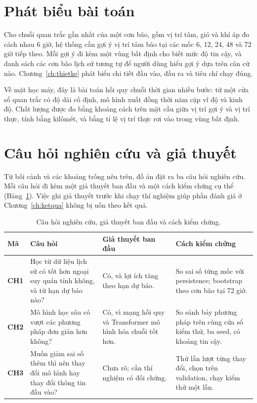 \section{Phát biểu bài toán}

Cho chuỗi quan trắc gần nhất của một cơn bão, gồm vị trí tâm, gió và khí áp
đo cách nhau 6 giờ, hệ thống cần gợi ý vị trí tâm bão tại các mốc 6, 12, 24,
48 và 72 giờ tiếp theo. Mỗi gợi ý đi kèm một vùng bất định cho biết mức độ
tin cậy, và danh sách các cơn bão lịch sử tương tự để người dùng hiểu gợi ý
dựa trên căn cứ nào. Chương~\ref{ch:thietke} phát biểu chi tiết đầu vào, đầu
ra và tiêu chí chạy đúng.

Về mặt học máy, đây là bài toán hồi quy chuỗi thời gian nhiều bước: từ một cửa
sổ quan trắc có độ dài cố định, mô hình xuất đồng thời năm cặp vĩ độ và kinh
độ. Chất lượng được đo bằng khoảng cách trên mặt cầu giữa vị trí gợi ý và vị
trí thực, tính bằng kilômét, và bằng tỉ lệ vị trí thực rơi vào trong vùng bất
định.

\section{Câu hỏi nghiên cứu và giả thuyết}

Từ bối cảnh và các khoảng trống nêu trên, đồ án đặt ra ba câu hỏi nghiên cứu.
Mỗi câu hỏi đi kèm một giả thuyết ban đầu và một cách kiểm chứng cụ thể
(Bảng~\ref{tab:cauhoi}). Việc ghi giả thuyết trước khi chạy thí nghiệm giúp
phần đánh giá ở Chương~\ref{ch:ketqua} không bị uốn theo kết quả.

\begin{table}[H]
\centering
\caption{Câu hỏi nghiên cứu, giả thuyết ban đầu và cách kiểm chứng.}
\label{tab:cauhoi}
\begin{tabularx}{\textwidth}{>{\bfseries\color{daunavy}}l X X X}
\toprule
\rowcolor{gray100}\bfseries\color{daunavy}Mã & \leavevmode\bfseries\color{daunavy}Câu hỏi & \leavevmode\bfseries\color{daunavy}Giả thuyết ban đầu & \leavevmode\bfseries\color{daunavy}Cách kiểm chứng \\
\midrule
CH1 & Học từ dữ liệu lịch sử có tốt hơn ngoại suy quán tính không, và từ hạn dự báo nào?
    & Có, và lợi ích tăng theo hạn dự báo.
    & So sai số từng mốc với persistence; bootstrap theo cơn bão tại 72 giờ. \\
CH2 & Mô hình học sâu có vượt các phương pháp đơn giản hơn không?
    & Có, vì mạng hồi quy và Transformer mô hình hóa chuỗi tốt hơn.
    & So sánh bảy phương pháp trên cùng cửa sổ kiểm thử, ba seed, có khoảng tin cậy. \\
CH3 & Muốn giảm sai số thêm thì nên thay đổi mô hình hay thay đổi thông tin đầu vào?
    & Chưa rõ; cần thí nghiệm có đối chứng.
    & Thử lần lượt từng thay đổi, chọn trên validation, chạy kiểm thử một lần. \\
\bottomrule
\end{tabularx}
\end{table}

